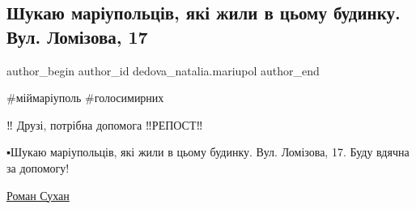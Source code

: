  
 
 
 
 

\subsection{Шукаю маріупольців, які жили в цьому будинку. Вул. Ломізова, 17}
\label{sec:31_01_2023.fb.dedova_natalia.mariupol.3.shukayu_mar_upolts_v}

\ifcmt
 author_begin
   author_id dedova_natalia.mariupol
 author_end
\fi

\#міймаріуполь 
\#голосимирних

‼️ Друзі, потрібна допомога ‼️РЕПОСТ‼️

▪️Шукаю маріупольців, які жили в цьому будинку. Вул. Ломізова, 17. Буду вдячна за допомогу!

\href{https://www.facebook.com/roman.sukhan}{Роман Сухан}
